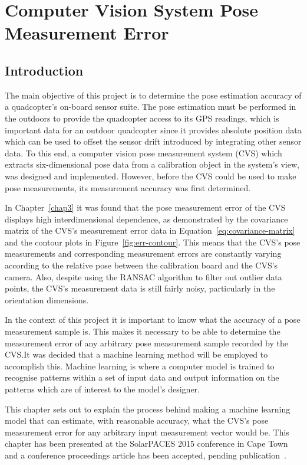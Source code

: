\chapter[CVS Pose Measurement Error]{Computer Vision System Pose Measurement Error}
\label{chap4}

\section{Introduction}

The main objective of this project is to determine the pose estimation accuracy of a quadcopter's on-board sensor suite. The pose estimation must be performed in the outdoors to provide the quadcopter access to its GPS readings, which is important data for an outdoor quadcopter since it provides absolute position data which can be used to offset the sensor drift introduced by integrating other sensor data. To this end, a computer vision pose measurement system (CVS) which extracts six-dimensional pose data from a calibration object in the system's view, was designed and implemented. However, before the CVS could be used to make pose measurements, its measurement accuracy was first determined. 

In Chapter~\ref{chap3} it was found that the pose measurement error of the CVS displays high interdimensional dependence, as demonstrated by the covariance matrix of the CVS's measurement error data in Equation~\ref{eq:covariance-matrix} and the contour plots in Figure~\ref{fig:err-contour}. This means that the CVS's pose measurements and corresponding measurement errors are constantly varying according to the relative pose between the calibration board and the CVS's camera. Also, despite using the RANSAC algorithm to filter out outlier data points, the CVS's measurement data is still fairly noisy, particularly in the orientation dimensions.

In the context of this project it is important to know what the accuracy of a pose measurement sample is. This makes it necessary to be able to determine the measurement error of any arbitrary pose measurement sample recorded by the CVS.\@ It was decided that a machine learning method will be employed to accomplish this. Machine learning is where a computer model is trained to recognise patterns within a set of input data and output information on the patterns which are of interest to the model's designer. 

This chapter sets out to explain the process behind making a machine learning model that can estimate, with reasonable accuracy, what the CVS's pose measurement error for any arbitrary input measurement vector would be. This chapter has been presented at the SolarPACES 2015 conference in Cape Town and a conference proceedings article has been accepted, pending publication~\citep{lock2015}. 

